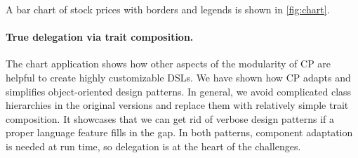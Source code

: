 A bar chart of stock prices with borders and legends is shown in
\autoref{fig:chart}.

\paragraph{True delegation via trait composition.}
The chart application shows how other aspects of the modularity of CP are
helpful to create highly customizable DSLs. We have shown how CP adapts and
simplifies object-oriented design patterns. In general, we avoid complicated
class hierarchies in the original versions and replace them with relatively
simple trait composition. It showcases that we can get rid of verbose design
patterns if a proper language feature fills in the gap. In both patterns,
component adaptation is needed at run time, so delegation is at the heart of the
challenges.
